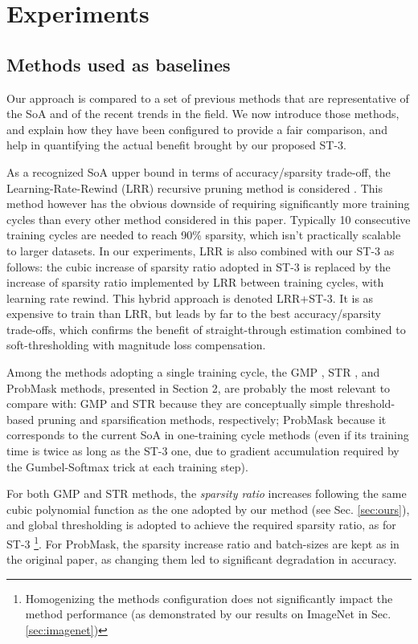 \documentclass[10pt,twocolumn,letterpaper]{article}
\begin{document}
\section{Experiments}\label{sec:experiments}
\subsection{Methods used as baselines}\label{sec:methods}
Our approach is compared to a set of previous methods that are representative of the SoA and of the recent trends in the field. We now introduce those methods, and explain how they have been configured to provide a fair comparison, and help in quantifying the actual benefit brought by our proposed ST-3.

As a recognized SoA upper bound in terms of accuracy/sparsity trade-off, the Learning-Rate-Rewind (LRR) recursive pruning method is considered \cite{Renda2020}. This method however has the obvious downside of requiring significantly more training cycles than every other method considered in this paper. Typically 10 consecutive training cycles are needed to reach 90\% sparsity, which isn't practically scalable to larger datasets. In our experiments, LRR is also combined with our ST-3 as follows: the cubic increase of sparsity ratio adopted in ST-3 is replaced by the increase of sparsity ratio implemented by LRR between training cycles, with learning rate rewind. This hybrid approach is denoted LRR+ST-3. It is as expensive to train than LRR, but leads by far to the best accuracy/sparsity trade-offs, which confirms the benefit of straight-through estimation combined to soft-thresholding with magnitude loss compensation.

Among the methods adopting a single training cycle, the GMP \cite{Zhu2018}, STR \cite{Kusupati2020}, and ProbMask \cite{Zhou2021} methods, presented in Section 2, are probably the most relevant to compare with: GMP and STR because they are conceptually simple threshold-based pruning and sparsification methods, respectively; ProbMask because it corresponds to the current SoA in one-training cycle methods (even if its training time is twice as long as the ST-3 one, due to gradient accumulation required by the Gumbel-Softmax trick at each training step). 


For both GMP and STR methods, the \emph{sparsity ratio} increases following the same cubic polynomial function as the one adopted by our method (see Sec. \ref{sec:ours}), and global thresholding is adopted to achieve the required sparsity ratio, as for ST-3 \footnote{Homogenizing the methods configuration does not significantly impact the method performance (as demonstrated by our results on ImageNet in Sec. \ref{sec:imagenet})}.
For ProbMask, the sparsity increase ratio and batch-sizes are kept as in the original paper, as changing them led to significant degradation in accuracy. 
\end{document}
